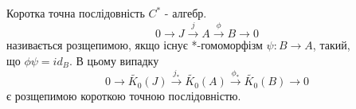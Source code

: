 \begin{remark}
    Коротка точна послідовність $C^*$ - алгебр.
    \begin{equation*}
        \label{eq: 8}
        0 \to J \xrightarrow{j} A \xrightarrow{\phi} B \to 0
    \end{equation*}
    називається розщепимою, якщо існує *-гомоморфізм $\psi: B \to A$, такий,\\ що $\phi \psi = id_B$.
    В цьому випадку
    \begin{equation*}
        0 \to \widetilde{K_0}(J) \xrightarrow{j_*} \widetilde{K_0}(A) \xrightarrow{\phi_*} \widetilde{K_0}(B) \to 0
    \end{equation*}
    є розщепимою короткою точною послідовністю.
\end{remark}

